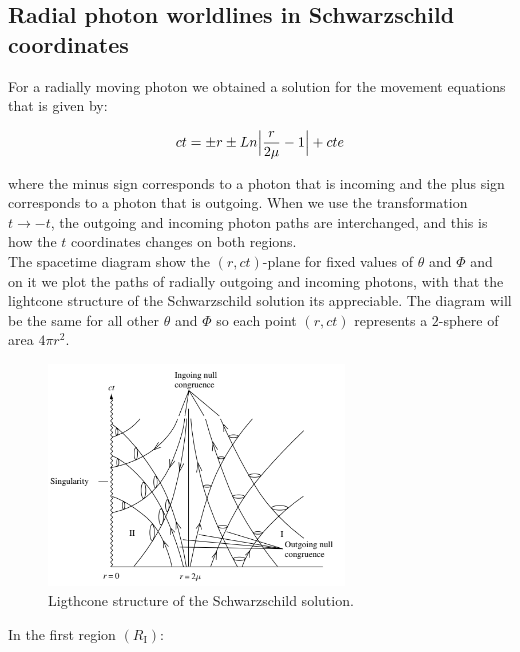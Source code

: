 \documentclass[letterpaper,11pt,onecolumn]{article}
\begin{document}
\subsection{Radial photon worldlines in Schwarzschild coordinates}
For a radially moving photon we obtained a solution for the movement equations that is given by:

\begin{equation}
ct=\pm r\pm Ln\Big| \frac{r}{2\mu}-1 \Big|+cte \label{3}\\
\end{equation}

where the minus sign corresponds to a photon that is incoming and the plus sign corresponds to a photon that is outgoing. When we use the transformation $t\rightarrow -t$, the outgoing and incoming photon paths are interchanged, and this is how the $t$ coordinates changes on both regions.\\
The spacetime diagram show the $(r,ct)$-plane for fixed values of $\theta$ and $\Phi$ and on it we plot the paths of radially outgoing and incoming photons, with that the lightcone structure of the Schwarzschild solution its appreciable. The diagram will be the same for all other $\theta$ and $\Phi$ so each point $(r,ct)$ represents a $2$-sphere of area $4\pi r^2$.
\\
\begin{figure}[h!]
    \centering
    \includegraphics[width=0.7\textwidth]{Report/Images/4bhphotons.png}
    \caption{Ligthcone structure of the Schwarzschild solution.}
\label{fig3}
\end{figure}
In the first region $(R_{\mathrm{I}})$:
\end{document}
